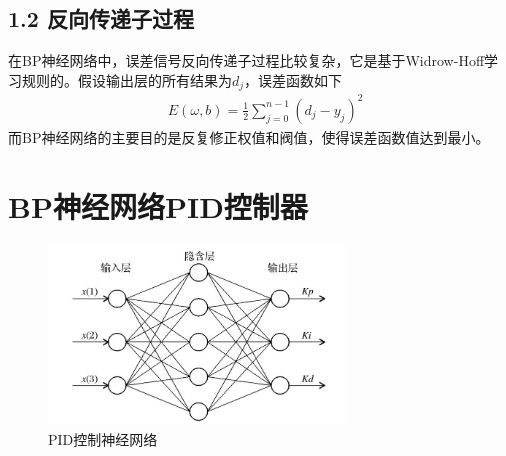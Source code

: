 \documentclass[UTF8,a4paper,10pt,nocolorlinks]{ctexart}
\begin{document}
    \subsection*{1.2 反向传递子过程}
    在BP神经网络中，误差信号反向传递子过程比较复杂，它是基于Widrow-Hoff学习规则的。假设输出层的所有结果为$d_{j}$，误差函数如下
    \begin{equation} %
        \begin{aligned}
        & E(\omega, b) =\frac{1}{2}\sum\limits_{j=0}^{n-1}(d_{j} - y_{j}) ^ 2 \nonumber 
        \end{aligned}
    \end{equation}
    而BP神经网络的主要目的是反复修正权值和阀值，使得误差函数值达到最小。

    
    \section{BP神经网络PID控制器}
    \begin{figure}[H]
        \centering %
        \includegraphics[width=0.7\textwidth]{PID_mode.jpg} %
        \caption{PID控制神经网络}
        \label{PID_BP}
    \end{figure}
\end{document}
